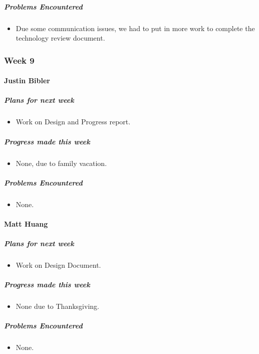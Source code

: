 {\subparagraph{Problems Encountered}
\begin{itemize}
  \item Due some communication issues, we had to put in more work to complete the technology review document.
\end{itemize}

}

\newpage

{
\subsubsection{Week 9}
\paragraph{Justin Bibler}
\subparagraph{Plans for next week}
\begin{itemize}
  \item Work on Design and Progress report.
\end{itemize}

\subparagraph{Progress made this week}
\begin{itemize}
  \item None, due to family vacation.
\end{itemize}

\subparagraph{Problems Encountered}
\begin{itemize}
  \item None.
\end{itemize}

\vspace{3mm}

\paragraph{Matt Huang}
\subparagraph{Plans for next week}
\begin{itemize}
  \item Work on Design Document.
\end{itemize}

\subparagraph{Progress made this week}
\begin{itemize}
  \item None due to Thanksgiving.
\end{itemize}

\subparagraph{Problems Encountered}
\begin{itemize}
  \item None.
\end{itemize}

}
